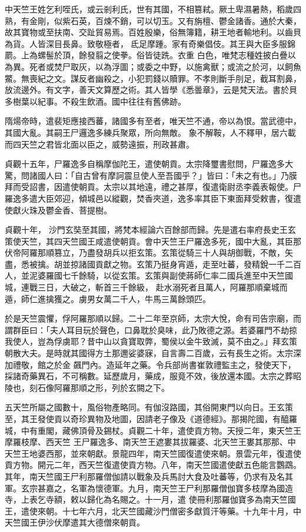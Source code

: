 \begin{pinyinscope}
 中天竺王姓乞利咥氏，或云剎利氏，世有其國，不相篡弒。厥土卑濕暑熱，稻歲四熟，有金剛，似紫石英，百煉不銷，可以切玉。又有旃檀、鬱金諸香。通於大秦，故其寶物或至扶南、交趾貿易焉。百姓殷樂，俗無簿籍，耕王地者輸地利。以齒貝為貨。人皆深目長鼻。致敬極者，氐足摩踵。家有奇樂倡伎。其王與大臣多服錦罽。上為螺髻於頂，餘發翦之使拳。俗皆徒跣。衣重
 白色，唯梵志種姓披白疊以為異。死者或焚尸取灰，以為浮圖；或委之中野，以施禽獸；或流之於河，以飼魚鱉。無喪紀之文。謀反者幽殺之，小犯罰錢以贖罪。不孝則斷手刖足，截耳割鼻，放流邊外。有文字，善天文算歷之術。其人皆學《悉曇章》，云是梵天法。書於貝多樹葉以紀事。不殺生飲酒。國中往往有舊佛跡。



 隋煬帝時，遣裴矩應接西蕃，諸國多有至者，唯天竺不通，帝以為恨。當武德中，其國大亂。其嗣王尸邏逸多練兵聚眾，所向無敵。
 象不解鞍，人不釋甲，居六載而四天竺之君皆北面以臣之，威勢遠振，刑政甚肅。



 貞觀十五年，尸羅逸多自稱摩伽陀王，遣使朝貢。太宗降璽書慰問，尸羅逸多大驚，問諸國人曰：「自古曾有摩訶震旦使人至吾國乎？」皆曰：「未之有也。」乃膜拜而受詔書，因遣使朝貢。太宗以其地遠，禮之甚厚，復遣衛尉丞李義表報使。尸羅逸多遣大臣郊迎，傾城邑以縱觀，焚香夾道，逸多率其臣下東面拜受敕書，復遣使獻火珠及鬱金香、菩提樹。



 貞觀十年，
 沙門玄奘至其國，將梵本經論六百餘部而歸。先是遣右率府長史王玄策使天竺，其四天竺國王咸遣使朝貢。會中天竺王尸羅逸多死，國中大亂，其臣那伏帝阿羅那順篡立，乃盡發胡兵以拒玄策。玄策從騎三十人與胡御戰，不敵，矢盡，悉被擒。胡並掠諸國貢獻之物。玄策乃挺身宵遁，走至吐蕃，發精銳一千二百人，並泥婆羅國七千餘騎，以從玄策。玄策與副使蔣師仁率二國兵進至中天竺國城，連戰三日，大破之，斬首三千餘級，
 赴水溺死者且萬人，阿羅那順棄城而遁，師仁進擒獲之。虜男女萬二千人，牛馬三萬餘頭匹。



 於是天竺震懼，俘阿羅那順以歸。二十二年至京師，太宗大悅，命有司告宗廟，而謂群臣曰：「夫人耳目玩於聲色，口鼻耽於臭味，此乃敗德之源。若婆羅門不劫掠我使人，豈為俘虜耶？昔中山以貪寶取弊，蜀侯以金牛致滅，莫不由之。」拜玄策朝散大夫。是時就其國得方土那邇娑婆寐，自言壽二百歲，云有長生之術。太宗深加禮敬，館之於金
 飆門內。造延年之藥。令兵部尚書崔敦禮監主之，發使天下，採諸奇藥異石，不可稱數。延歷歲月，藥成，服竟不效，後放還本國。太宗之葬昭陵也，刻石像阿羅那順之形，列於玄闕之下。



 五天竺所屬之國數十，風俗物產略同。有伽沒路國，其俗開東門以向日。王玄策至，其王發使貢以奇珍異物及地圖，因請老子像及《道德經》。那揭陀國，有醯羅城，中有重閣，藏佛頂骨及錫杖。貞觀二十年，遣使貢方物。天授二年，東天竺王摩羅枝摩、西天竺
 王尸羅逸多、南天竺王遮婁其拔羅婆、北天竺王婁其那那、中天竺王地婆西那，並來朝獻。景龍四年，南天竺國復遣使來朝。景雲元年，復遣使貢方物。開元二年，西天竺復遣使貢方物。八年，南天竺國遣使獻五色能言鸚鵡。其年，南天竺國王尸利那羅僧伽請以戰象及兵馬討大食及吐蕃等，仍求有及名其軍。玄宗甚嘉之，名軍為懷德軍。九月，南天竺王尸利那羅僧伽寶多枝摩為國造寺，上表乞寺額，敕以歸化為名賜之。十一月，遣
 使冊利那羅伽寶多為南天竺國王，遣使來朝。十七年六月，北天竺國藏沙門僧密多獻質汗等藥。十九年十月，中天竺國王伊沙伏摩遣其大德僧來朝貢。




\end{pinyinscope}
